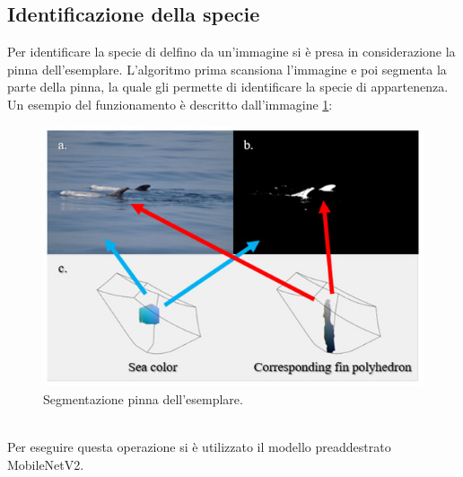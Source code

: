\documentclass[a4paper,final,12pt]{report}
\begin{document}
\subsection{Identificazione della specie}
Per identificare la specie di delfino da un'immagine si è presa in considerazione la pinna dell'esemplare. L'algoritmo prima scansiona l'immagine e poi segmenta la parte della pinna, la quale gli permette di identificare la specie di appartenenza.
Un esempio del funzionamento è descritto dall'immagine \ref{figura:sezpinna}:\\
\begin{figure}[hbtp]
\centering
\includegraphics[scale=0.70]{img_concettuale/pinnedelfini.jpg}
\caption{Segmentazione pinna dell'esemplare. \cite{pinnaDelf}}
\label{figura:sezpinna}
\end{figure}
\\Per eseguire questa operazione si è utilizzato il modello preaddestrato MobileNetV2.
\end{document}
